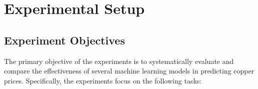 \documentclass[final-report]{report-template}
\begin{document}



\section{Experimental Setup}

\subsection{Experiment Objectives}
The primary objective of the experiments is to systematically evaluate and compare the effectiveness of several machine learning models in predicting copper prices. Specifically, the experiments focus on the following tasks:
\end{document}
